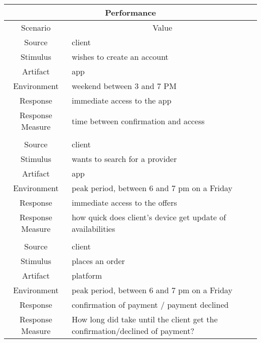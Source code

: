 \begin{table}[H]
    \begin{tabularx}{\textwidth}{|c|X|}
        \hline
        \multicolumn{2}{c}{\textbf{Performance}} \\
        \hline
        \toprule
        \multicolumn{1}{c}{Scenario} & \multicolumn{1}{c}{Value} \\
        \midrule
        Source & \gls{client}  \\
        Stimulus & wishes to create an account \\
        Artifact & app \\
        Environment & weekend between 3 and 7 PM \\
        Response & immediate access to the app \\
        Response Measure & time between confirmation and access \\
         & \\
        Source & \gls{client}  \\
        Stimulus & wants to search for a \gls{provider} \\
        Artifact & app \\
        Environment & peak period, between 6 and 7 pm on a Friday \\
        Response & immediate access to the offers \\
        Response Measure & how quick does client's device get update of availabilities \\
        & \\
        Source & \gls{client}  \\
        Stimulus & places an order \\
        Artifact & platform \\
        Environment & peak period, between 6 and 7 pm on a Friday \\
        Response & confirmation of payment / payment declined \\
        Response Measure & How long did take until the client get the confirmation/declined of payment?\\
        \bottomrule
    \end{tabularx}
\end{table}

